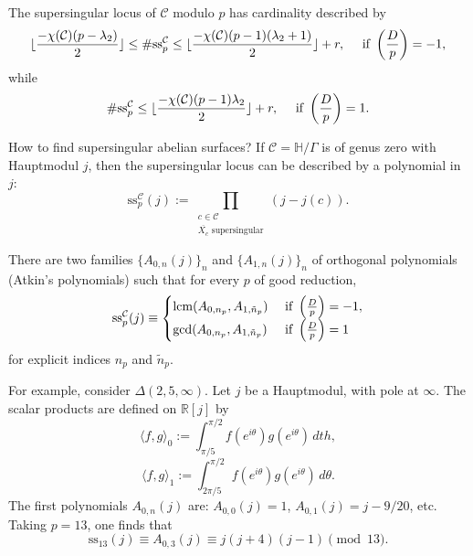 \documentclass[reqno]{amsart} 
\begin{document}
\begin{theorem}[B--Li, 2024]
  The supersingular locus of $\mathcal{C}$ modulo $p$ has cardinality described by
  \begin{align*}
    \lfloor \frac{- \chi(\mathcal{C})(p - \lambda_2)}{2} \rfloor \leq
    \#\mathrm{ss}_p^{\mathcal{C}}
    \leq \lfloor
    \frac{- \chi(\mathcal{C})(p - 1)(\lambda_2 + 1)}{2}\rfloor + r, \quad \text{ if } \left( \frac{D}{p} \right) = -1,
  \end{align*}
  while
  \begin{equation*}
    \# \mathrm{ss}_p^{\mathcal{C}}
    \leq \lfloor \frac{- \chi(\mathcal{C})(p - 1) \lambda_2}{2} \rfloor + r,
    \quad \text{ if } \left( \frac{D}{p} \right) = 1.
  \end{equation*}
\end{theorem}

How to find supersingular abelian surfaces?  If $\mathcal{C} = \mathbb{H} / \Gamma$  is of genus zero with Hauptmodul $j$, then the supersingular locus can be described by a polynomial in $j$:
\begin{equation*}
  \mathrm{ss}_p^{\mathcal{C}}(j) :=
  \prod_{
    \substack{
      c \in \mathcal{C}  \\
      \overline{X_c} \text{ supersingular}
    }
  }
  \left( j - j(c) \right).
\end{equation*}

\begin{theorem}[B.--Li, 2024]
  There are two families $\{A_{0, n}(j)\}_n$ and $\{A_{1, n}(j)\}_n$ of orthogonal polynomials (Atkin's polynomials) such that for every $p$ of good reduction,
  \begin{equation*}
    \mathrm{ss}_p^{\mathcal{C}}(j) \equiv
    \begin{cases}
      \operatorname{lcm}(A_{0, n_p}, A_{1, \tilde{n}_p})      & \text{ if } \left( \frac{D}{p} \right) = -1, \\
      \gcd(A_{0, n_p}, A_{1, \tilde{n}_p})                                                & \text{ if } \left( \frac{D}{p} \right) = 1
    \end{cases}
  \end{equation*}
  for explicit indices $n_p$ and $\tilde{n}_p$.
\end{theorem}

For example, consider $\Delta(2, 5, \infty)$.  Let $j$ be a Hauptmodul, with pole at $\infty$.  The scalar products are defined on $\mathbb{R}[j]$ by
\begin{equation*}
  \langle f, g \rangle_0 :=
  \int_{\pi / 5}^{\pi / 2}
  f(e^{i \theta})
  g(e^{i \theta}) \, d th,
\end{equation*}
\begin{equation*}
  \langle f, g \rangle_1 := \int_{2 \pi / 5}^{\pi / 2}
  f(e^{i \theta}) g(e^{i \theta}) \, d \theta.
\end{equation*}
The first polynomials $A_{0, n}(j)$ are: $A_{0, 0}(j) = 1$, $A_{0, 1}(j) = j - 9/20$, etc.  Taking $p = 13$, one finds that
\begin{equation*}
  \mathrm{ss}_{13}(j) \equiv A_{0, 3}(j) \equiv j(j + 4)(j - 1) \pmod{13}.
\end{equation*}
\end{document}
